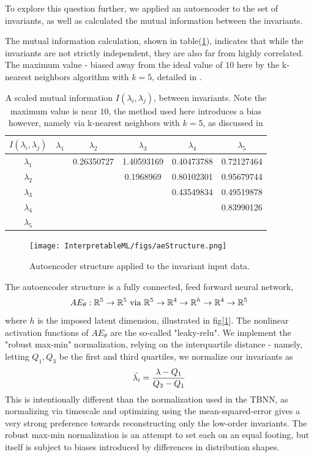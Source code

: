 To explore this question further, we applied an autoencoder to the set of invariants, as well as calculated the mutual information between the invariants.

The mutual information calculation, shown in table(\ref{tab:mutualInformation}), indicates that while the invariants are not strictly independent, they are also far from highly correlated. The maximum value - biased away from the ideal value of $10$ here by the k-nearest neighbors algorithm with $k=5$, detailed in \cite{ross2014mutual}.
\begin{table}
\centering
\begin{tabular}{|c|c|c|c|c|c|}
  \hline
  $I(\lambda_i, \lambda_j)$ & $\lambda_1$ & $\lambda_2$ & $\lambda_3$ & $\lambda_4$ & $\lambda_5$\\
  \hline
  $\lambda_1$ & & 0.26350727 & 1.40593169 & 0.40473788 & 0.72127464\\
  \hline
  $\lambda_2$ & & & 0.1968969 &  0.80102301 & 0.95679744\\
  \hline
  $\lambda_3$ &  &  & & 0.43549834 & 0.49519878\\
  \hline
  $\lambda_4$ & & & & & 0.83990126\\
  \hline
  $\lambda_5$ & & & & & \\
  \hline
\end{tabular}
  \caption{A scaled mutual information $I(\lambda_i, \lambda_j)$, between invariants. Note the maximum value is near $10$, the method used here introduces a bias however, namely via k-nearest neighbors with $k=5$, as discussed in \cite{ross2014mutual}}
    \label{tab:mutualInformation}
\end{table} 

\begin{figure}
    \centering
    \texttt{[image: InterpretableML/figs/aeStructure.png]}
    \caption{Autoencoder structure applied to the invariant input data.}
    \label{fig:aeStructure}
\end{figure}

The autoencoder structure is a fully connected, feed forward neural network, 
\begin{equation}
    AE_\theta: \mathbb{R}^5 \to \mathbb{R}^5 \text{ via } \mathbb{R}^5 \to \mathbb{R}^4 \to \mathbb{R}^h \to \mathbb{R}^4 \to \mathbb{R}^5
\end{equation}
where $h$ is the imposed latent dimension, illustrated in fig[\ref{fig:aeStructure}]. The nonlinear activation functions of $AE_\theta$ are the so-called "leaky-relu". We implement the "robust max-min" normalization, relying on the interquartile distance - namely, letting $Q_1, Q_3$ be the first and third quartiles, we normalize our invariants as
\begin{equation}
    \Tilde{\lambda_i} = \frac{\lambda - Q_1}{Q_3 - Q_1}
\end{equation}
This is intentionally different than the normalization used in the TBNN, as normalizing via timescale and optimizing using the mean-squared-error gives a very strong preference towards reconstructing only the low-order invariants. The robust max-min normalization is an attempt to set each on an equal footing, but itself is subject to biases introduced by differences in distribution shapes.

